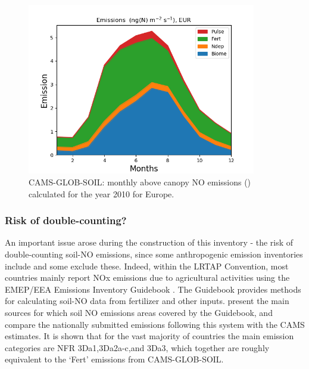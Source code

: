 \begin{figure}
  \centering
   \includegraphics*[width=10cm]{FIGS_UPDATES/PlotRegionalTimeSeriesMonthly_EUR_YLnSMI_Mar2021.png}
  \parbox{10cm}{
  \caption{CAMS-GLOB-SOIL: monthly above canopy NO emissions (\ngN)  calculated for the year 2010
     for Europe.
    \label{fig:SIemis}}
  }
\end{figure}


\subsubsection{Risk of double-counting?}

An important issue arose during the construction  of this inventory - the risk of double-counting
soil-NO emissions, since some anthropogenic  emission inventories include and 
some exclude these.
Indeed, within the LRTAP Convention,
most countries mainly report NOx emissions due to agricultural activities
using the EMEP/EEA Emissions Inventory Guidebook
\citep{Guidebook2019:3D}. The Guidebook provides methods for calculating
soil-NO data from fertilizer and other inputs.
\citet{SimpsonDarras:2021} present the main sources for which
 soil NO emissions areas covered by the Guidebook, and
compare the nationally
submitted emissions following this system with the CAMS estimates.
It is shown that for the vast majority of countries
the main emission categories are NFR  3Da1,3Da2a-c,and
3Da3, which together are roughly equivalent to
the `Fert' emissions from CAMS-GLOB-SOIL.

